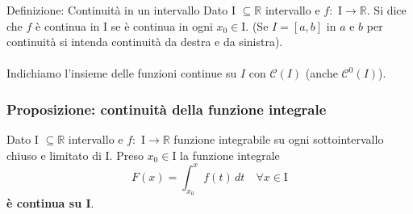 \documentclass[x11names]{article}
\begin{document}
		\begin{center}
		\colorbox{myblue}{\begin{minipage}{5.75in}
				\begin{blues}{Definizione: Continuità in un intervallo}
					Dato I $\subseteq \mathbb{R}$ intervallo e $f:$ I$\to \mathbb{R}$. Si dice che $f$ è continua in I se è continua in ogni $x_0 \in \text{I}$. (Se $I = [a,b]$ in $a$ e $b$ per continuità si intenda continuità da destra e da sinistra). \\ \\
					Indichiamo l'insieme delle funzioni continue su $I$ con $\mathcal{C}\left(I\right)$ (anche $\mathcal{C}^0\left(I\right)$).
				\end{blues}
		\end{minipage}}       
	\end{center}
	\begin{center}
		\colorbox{myred}{\begin{minipage}{5.75in}
				\begin{redes}{}
					\subsubsection{Proposizione: continuità della funzione integrale}
					Dato I $\subseteq \mathbb{R}$ intervallo e $f:$ I$\to \mathbb{R}$ funzione integrabile su ogni sottointervallo chiuso e limitato di I. Preso $x_0 \in \text{I}$ la funzione integrale
					\[
					F(x) = \int_{x_0}^{x}f(t) \,dt \quad \forall x \in \text{I}
					\]
					\textbf{è continua su I}.
				\end{redes}
		\end{minipage}}        
	\end{center}
\end{document}
